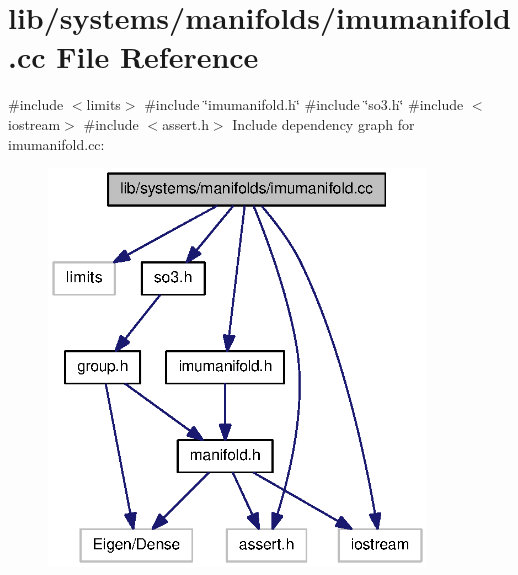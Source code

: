 \section{lib/systems/manifolds/imumanifold.cc \-File \-Reference}
\label{imumanifold_8cc}
{\ttfamily \#include $<$limits$>$}\*
{\ttfamily \#include \char`\"{}imumanifold.\-h\char`\"{}}\*
{\ttfamily \#include \char`\"{}so3.\-h\char`\"{}}\*
{\ttfamily \#include $<$iostream$>$}\*
{\ttfamily \#include $<$assert.\-h$>$}\*
\-Include dependency graph for imumanifold.\-cc\-:
\nopagebreak
\begin{figure}[H]
\begin{center}
\leavevmode
\includegraphics[width=284pt]{imumanifold_8cc__incl}
\end{center}
\end{figure}
